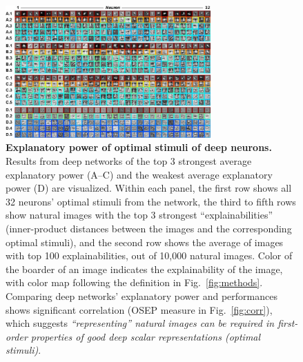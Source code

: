 \documentclass[10pt,twocolumn,letterpaper]{article}
\begin{document}
\begin{figure}
\begin{center}
\includegraphics[width=0.70\textwidth]{Figs/pic2.pdf} 
\end{center}
\caption{{\bf Explanatory power of optimal stimuli of deep neurons.}
Results from deep networks of the top 3 strongest average explanatory power (A--C) and the weakest average explanatory power (D) are visualized.
Within each panel, the first row shows all 32 neurons' optimal stimuli from the network, the third to fifth rows show natural images with the top 3 strongest ``explainabilities'' (\ie inner-product distances between the images and the corresponding optimal stimuli), and the second row shows the average of images with top 100 explainabilities, out of 10,000 natural images.
Color of the boarder of an image indicates the explainability of the image, with color map following the definition in Fig.~\ref{fig:methods}.
Comparing deep networks' explanatory power and performances shows significant correlation (OSEP measure in Fig.~\ref{fig:corr}), which suggests \emph{``representing'' natural images can be required in first-order properties of good deep scalar representations (\ie optimal stimuli)}.
}
\label{fig:exppow}
\end{figure}
\end{document}

